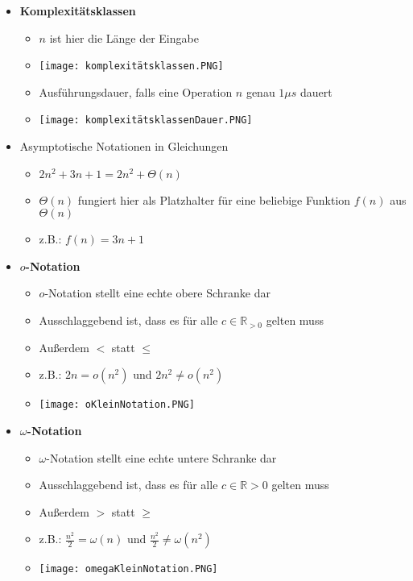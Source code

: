 \begin{itemize}
        \item \textbf{Komplexitätsklassen}
            \begin{itemize}
                \item $n$ ist hier die Länge der Eingabe
                \item[] \texttt{[image: komplexitätsklassen.PNG]}
                \item Ausführungsdauer, falls eine Operation $n$ genau $1\mu s$ dauert 
                \item[] \texttt{[image: komplexitätsklassenDauer.PNG]}
            \end{itemize}
        
        \item Asymptotische Notationen in Gleichungen
            \begin{itemize}
                \item $2n^2 + 3n + 1 = 2n^2 + \Theta(n)$
                \item $\Theta(n)$ fungiert hier als Platzhalter für eine beliebige Funktion $f(n)$ aus $\Theta(n)$
                \item z.B.: $f(n) = 3n + 1$
            \end{itemize}
        
        \item \textbf{$o$-Notation}
            \begin{itemize}
                \item $o$-Notation stellt eine echte obere Schranke dar
                \item Ausschlaggebend ist, dass es für alle $c \in \mathbb{R}_{>0}$ gelten muss
                \item Au\ss erdem $<$ statt $\leq$
                \item z.B.: $2n = o(n^2)$ und $2n^2 \neq o(n^2)$ 
                \item[] \texttt{[image: oKleinNotation.PNG]}
                
            \end{itemize}
        
        \item \textbf{$\omega$-Notation}
            \begin{itemize}
                \item $\omega$-Notation stellt eine echte untere Schranke dar
                \item Ausschlaggebend ist, dass es für alle $c \in \mathbb{R}{>0}$ gelten muss
                \item Au\ss erdem $>$ statt $\geq$
                \item z.B.: $\frac{n^2}{2} = \omega(n)$ und $\frac{n^2}{2} \neq \omega(n^2)$
                \item[] \texttt{[image: omegaKleinNotation.PNG]}
            \end{itemize}
    \end{itemize}

